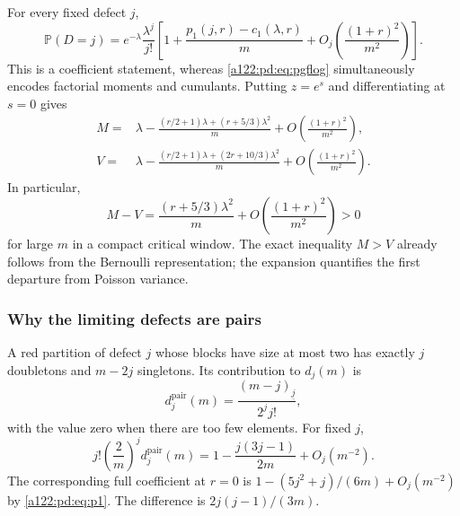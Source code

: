\documentclass[11pt,letterpaper]{article}
\numberwithin{equation}{subsection}
\theoremstyle{definition}
\theoremstyle{remark}
\theoremstyle{plain}
\newcommand{\Prob}{\mathbb P}
\newcommand{\fall}[2]{(#1)_{\underline{#2}}}
\begin{document}
For every fixed defect $j$,
\begin{equation}\label{a122:pd:eq:pmfcorrection}
 \Prob(D=j)=e^{-\lambda}\frac{\lambda^j}{j!}
 \left[1+\frac{p_1(j,r)-c_1(\lambda,r)}m
 +O_j\!\left(\frac{(1+r)^2}{m^2}\right)\right].
\end{equation}
This is a coefficient statement, whereas \eqref{a122:pd:eq:pgflog} simultaneously
encodes factorial moments and cumulants.
Putting $z=e^s$ and differentiating at $s=0$ gives
\begin{align}
 M={}&\lambda-
 \frac{(r/2+1)\lambda+(r+5/3)\lambda^2}{m}
 +O\!\left(\frac{(1+r)^2}{m^2}\right),\label{a122:pd:eq:Mcorrection}\\
 V={}&\lambda-
 \frac{(r/2+1)\lambda+(2r+10/3)\lambda^2}{m}
 +O\!\left(\frac{(1+r)^2}{m^2}\right).\label{a122:pd:eq:Vcorrection}
\end{align}
In particular,
\[
 M-V=\frac{(r+5/3)\lambda^2}{m}
 +O\!\left(\frac{(1+r)^2}{m^2}\right)>0
\]
for large $m$ in a compact critical window. The exact inequality
$M>V$ already follows from the Bernoulli representation; the expansion
quantifies the first departure from Poisson variance.

\subsubsection{Why the limiting defects are pairs}
A red partition of defect $j$ whose blocks have size at most two has
exactly $j$ doubletons and $m-2j$ singletons. Its contribution to $d_j(m)$
is
\begin{equation}\label{a122:pd:eq:pairterm}
 d_j^{\mathrm{pair}}(m)=\frac{\fall{m-j}{j}}{2^j j!},
\end{equation}
with the value zero when there are too few elements. For fixed $j$,
\[
 j!\left(\frac2m\right)^j d_j^{\mathrm{pair}}(m)
 =1-\frac{j(3j-1)}{2m}+O_j(m^{-2}).
\]
The corresponding full coefficient at $r=0$ is
$1-(5j^2+j)/(6m)+O_j(m^{-2})$ by \eqref{a122:pd:eq:p1}.
The difference is $2j(j-1)/(3m)$.
\end{document}
